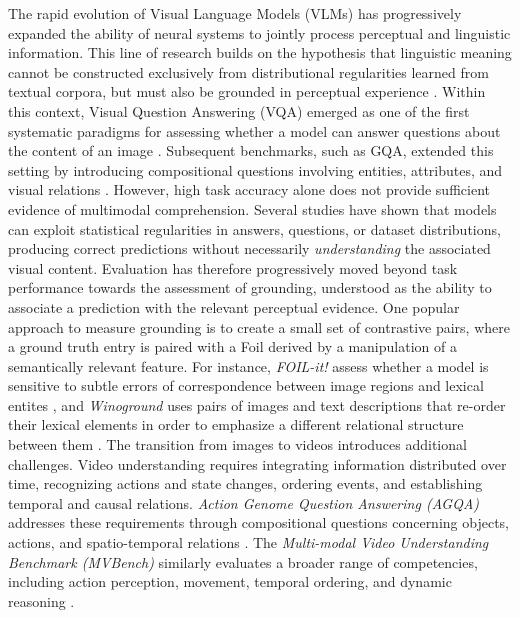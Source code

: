 The rapid evolution of Visual Language Models (\acsp{VLM}) has progressively expanded the ability of neural systems to jointly process perceptual and linguistic information. This line of research builds on the hypothesis that linguistic meaning cannot be constructed exclusively from distributional regularities learned from textual corpora, but must also be grounded in perceptual experience \cite{baroni2015grounding}. Within this context, Visual Question Answering (\acs{VQA}) emerged as one of the first systematic paradigms for assessing whether a model can answer questions about the content of an image \cite{antol2015vqa}. Subsequent benchmarks, such as GQA, extended this setting by introducing compositional questions involving entities, attributes, and visual relations \cite{hudson2019gqa}.
However, high task accuracy alone does not provide sufficient evidence of multimodal comprehension. Several studies have shown that models can exploit statistical regularities in answers, questions, or dataset distributions, producing correct predictions without necessarily \textit{understanding} the associated visual content. Evaluation has therefore progressively moved beyond task performance towards the assessment of grounding, understood as the ability to associate a prediction with the relevant perceptual evidence.
One popular approach to measure grounding is to create a small set of contrastive pairs, where a ground truth entry is paired with a Foil derived by a manipulation of a semantically relevant feature. For instance, \textit{FOIL-it!} assess whether a model is sensitive to subtle errors of correspondence between image regions and lexical entites \cite{shekhar2017foilit}, and \textit{Winoground} uses pairs of images and text descriptions that re-order their lexical elements in order to emphasize a different relational structure between them \cite{thrush2022winoground}.
The transition from images to videos introduces additional challenges. Video understanding requires integrating information distributed over time, recognizing actions and state changes, ordering events, and establishing temporal and causal relations. \textit{Action Genome Question Answering (\acs{AGQA})} addresses these requirements through compositional questions concerning objects, actions, and spatio-temporal relations \cite{grundemclaughlin2021agqa}. The \textit{Multi-modal Video Understanding Benchmark (\acs{MVBench})} similarly evaluates a broader range of competencies, including action perception, movement, temporal ordering, and dynamic reasoning \cite{li2024mvbench}.
